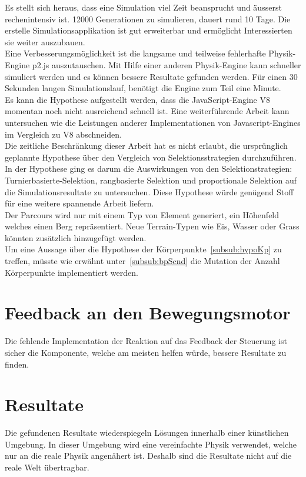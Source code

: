     Es stellt sich heraus, dass eine Simulation viel Zeit beansprucht und äusserst rechenintensiv ist.
    12000 Generationen zu simulieren, dauert rund 10 Tage.
    Die erstelle Simulationsapplikation ist gut erweiterbar und ermöglicht Interessierten sie weiter auszubauen.
    \\
    Eine Verbesserungsmöglichkeit ist die langsame und teilweise fehlerhafte Physik-Engine p2.js auszutauschen.
    Mit Hilfe einer anderen Physik-Engine kann schneller simuliert werden und es können bessere Resultate gefunden werden.
    Für einen 30 Sekunden langen Simulationslauf, benötigt die Engine zum Teil eine Minute.
    \\
    Es kann die Hypothese aufgestellt werden, dass die JavaScript-Engine V8 momentan noch nicht ausreichend schnell ist.
    Eine weiterführende Arbeit kann untersuchen wie die Leistungen anderer Implementationen von Javascript-Engines im
    Vergleich zu V8 abschneiden.
    \\
    Die zeitliche Beschränkung dieser Arbeit hat es nicht erlaubt,
    die ursprünglich geplannte Hypothese über den Vergleich von Selektionsstrategien durchzuführen.
    In der Hypothese ging es darum die Auswirkungen von den Selektionstrategien: Turnierbasierte-Selektion, rangbasierte Selektion
    und proportionale Selektion auf die Simulationsresultate zu untersuchen.
    Diese Hypothese würde genügend Stoff für eine weitere spannende Arbeit liefern.
    \\
    Der Parcours wird nur mit einem Typ von Element generiert, ein Höhenfeld welches einen Berg repräsentiert.
    Neue Terrain-Typen wie Eis, Wasser oder Grass könnten zusätzlich hinzugefügt werden.
    \\
    Um eine Aussage über die Hypothese der Körperpunkte~\vref{subsub:hypoKp} zu treffen,
    müsste wie erwähnt unter~\vref{subsub:bpScnd} die Mutation der Anzahl Körperpunkte implementiert werden.

  \section{Feedback an den Bewegungsmotor\label{sec:PerspectiveFeedback}}

    Die fehlende Implementation der Reaktion auf das Feedback der Steuerung ist sicher die Komponente,
    welche am meisten helfen würde, bessere Resultate zu finden.

  \section{Resultate}

    Die gefundenen Resultate wiederspiegeln Lösungen innerhalb einer künstlichen Umgebung.
    In dieser Umgebung wird eine vereinfachte Physik verwendet, welche nur an die reale Physik angenähert ist.
    Deshalb sind die Resultate nicht auf die reale Welt übertragbar.

